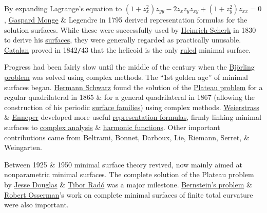 \documentclass{article}
\begin{document}
By expanding Lagrange's equation to $(1 + z_x^2)z_{yy} - 2z_xz_yz_{xy} + (1 + z_y^2)z_{xx} = 0$, \href{https://en.wikipedia.org/wiki/Gaspard_Monge}{\sc Gaspard Monge} \& {\sc Legendre} in 1795 derived representation formulas for the solution surfaces. While these were successfully used by \href{https://en.wikipedia.org/wiki/Heinrich_Scherk}{\sc Heinrich Scherk} in 1830 to derive his \href{https://en.wikipedia.org/wiki/Scherk_surface}{surfaces}, they were generally regarded as practically unusable. \href{https://en.wikipedia.org/wiki/Eug%C3%A8ne_Charles_Catalan}{\sc Catalan} proved in 1842{\tt/}43 that the helicoid is the only \href{https://en.wikipedia.org/wiki/Ruled_surface}{ruled} minimal surface.

Progress had been fairly slow until the middle of the century when the \href{https://en.wikipedia.org/wiki/Bj%C3%B6rling_problem}{Bj\"orling problem} was solved using complex methods. The ``1st golden age'' of minimal surfaces began. \href{https://en.wikipedia.org/wiki/Hermann_Schwarz}{\sc Hermann Schwarz} found the solution of the \href{https://en.wikipedia.org/wiki/Plateau_problem}{Plateau problem} for a regular quadrilateral in 1865 \& for a general quadrilateral in 1867 (allowing the construction of his periodic \href{https://en.wikipedia.org/wiki/Schwarz_minimal_surface}{surface families}) using complex methods. \href{https://en.wikipedia.org/wiki/Weierstrass}{\sc Weierstrass} \& \href{https://en.wikipedia.org/wiki/Alfred_Enneper}{\sc Enneper} developed more useful \href{https://en.wikipedia.org/wiki/Weierstrass%E2%80%93Enneper_parameterization}{representation formulas}, firmly linking minimal surfaces to \href{https://en.wikipedia.org/wiki/Complex_analysis}{complex analysis} \& \href{https://en.wikipedia.org/wiki/Harmonic_functions}{harmonic functions}. Other important contributions came from {\sc Beltrami, Bonnet, Darboux, Lie, Riemann, Serret, \& Weingarten}.

Between 1925 \& 1950 minimal surface theory revived, now mainly aimed at nonparametric minimal surfaces. The complete solution of the Plateau problem by \href{https://en.wikipedia.org/wiki/Jesse_Douglas}{\sc Jesse Douglas} \& \href{https://en.wikipedia.org/wiki/Tibor_Rad%C3%B3}{\sc Tibor Rad\'o} was a major milestone. \href{https://en.wikipedia.org/wiki/Bernstein%27s_problem}{Bernstein's problem} \& \href{https://en.wikipedia.org/wiki/Robert_Osserman}{\sc Robert Osserman}'s work on complete minimal surfaces of finite total curvature were also important.
\end{document}
